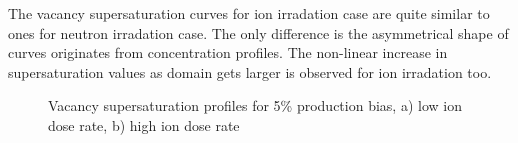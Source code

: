 \documentclass[a4paper]{article}
\begin{document}
    The vacancy supersaturation curves for ion irradation case are quite similar to ones for neutron irradation case. The only difference is the asymmetrical shape of curves originates from concentration profiles. The non-linear increase in supersaturation values as domain gets larger is observed for ion irradation too.
      \begin{figure}[h!]  %
        \centering
        \qquad
        \caption{Vacancy supersaturation profiles for 5\% production bias, a) low ion dose rate, b) high ion dose rate}
        \label{figure:vacancy_supersaturation_ion_5}
      \end{figure}
\end{document}
